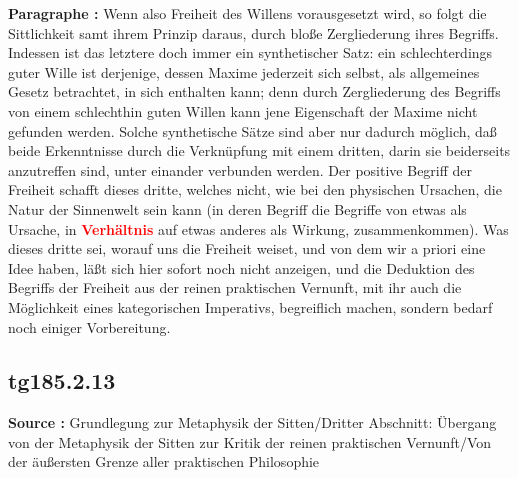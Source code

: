 \documentclass[a4paper,12pt,twoside]{book}
\newcommand{\match}[1]{\textcolor{red}{\textbf{#1}}}
\begin{document}
	\noindent\textbf{Paragraphe : }Wenn also Freiheit des Willens vorausgesetzt wird, so folgt die Sittlichkeit samt ihrem Prinzip daraus, durch bloße Zergliederung ihres Begriffs. Indessen ist das letztere doch immer ein synthetischer Satz: ein schlechterdings guter Wille ist derjenige, dessen Maxime jederzeit sich selbst, als allgemeines Gesetz betrachtet, in sich enthalten kann; denn durch Zergliederung des Begriffs von einem schlechthin guten Willen kann jene Eigenschaft der Maxime nicht gefunden werden. Solche synthetische Sätze sind aber nur dadurch möglich, daß beide Erkenntnisse durch die Verknüpfung mit einem dritten, darin sie beiderseits anzutreffen sind, unter einander verbunden werden. Der positive Begriff der Freiheit schafft dieses dritte, welches nicht, wie bei den physischen Ursachen, die Natur der Sinnenwelt sein kann (in deren Begriff die Begriffe von etwas als Ursache, in \match{Verhältnis} auf etwas anderes als Wirkung, zusammenkommen). Was dieses dritte sei, worauf uns die Freiheit weiset, und von dem wir a priori eine Idee haben, läßt sich hier sofort noch nicht anzeigen, und die Deduktion des Begriffs der Freiheit aus der reinen praktischen Vernunft, mit ihr auch die Möglichkeit eines kategorischen Imperativs, begreiflich machen, sondern bedarf noch einiger Vorbereitung. 
	
	\subsection*{tg185.2.13} 
	\textbf{Source : }Grundlegung zur Metaphysik der Sitten/Dritter Abschnitt: Übergang von der Metaphysik der Sitten zur Kritik der reinen praktischen Vernunft/Von der äußersten Grenze aller praktischen Philosophie\\  
	
\end{document}
